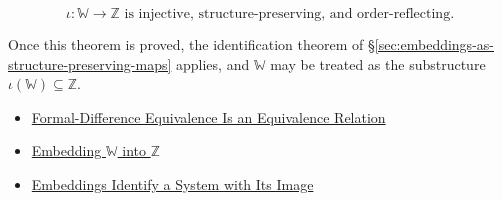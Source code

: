\begin{remark*}
\[
\iota:\mathbb{W}\to \mathbb{Z} \text{ is injective, structure-preserving, and order-reflecting.}
\]
\end{remark*}
\begin{remark*}[Interpretation]
Once this theorem is proved, the identification theorem of \S\ref{sec:embeddings-as-structure-preserving-maps} applies, and $\mathbb{W}$ may be treated as the substructure $\iota(\mathbb{W})\subseteq \mathbb{Z}$.
\end{remark*}
\begin{dependencies}
\begin{itemize}
  \item \hyperref[thm:formal-difference-equivalence-relation]{Formal-Difference Equivalence Is an Equivalence Relation}
  \item \hyperref[def:embedding-w-into-z]{Embedding $\mathbb{W}$ into $\mathbb{Z}$}
  \item \hyperref[thm:embedding-identifies-with-image]{Embeddings Identify a System with Its Image}
\end{itemize}
\end{dependencies}
